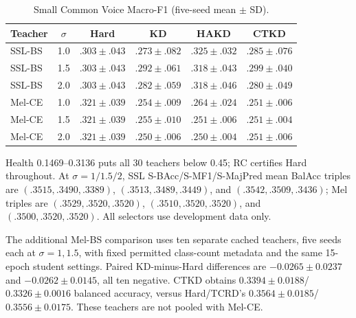 \documentclass[journal]{IEEEtran}
\begin{document}
\begin{table}[t]
\centering\caption{Small Common Voice Macro-F1 (five-seed mean $\pm$ SD).}
\label{tab:cv_mf1}
\scriptsize\setlength{\tabcolsep}{2pt}
\begin{tabular}{lccccc}
\toprule
Teacher & $\sigma$ & Hard & KD & HAKD & CTKD\\\midrule
SSL-BS&1.0&$.303\pm.043$&$.273\pm.082$&$.325\pm.032$&$.285\pm.076$\\
SSL-BS&1.5&$.303\pm.043$&$.292\pm.061$&$.318\pm.043$&$.299\pm.040$\\
SSL-BS&2.0&$.303\pm.043$&$.282\pm.059$&$.318\pm.046$&$.280\pm.049$\\
Mel-CE&1.0&$.321\pm.039$&$.254\pm.009$&$.264\pm.024$&$.251\pm.006$\\
Mel-CE&1.5&$.321\pm.039$&$.255\pm.010$&$.251\pm.006$&$.251\pm.004$\\
Mel-CE&2.0&$.321\pm.039$&$.250\pm.006$&$.250\pm.004$&$.251\pm.006$\\\bottomrule
\end{tabular}
\end{table}

Health 0.1469--0.3136 puts all 30 teachers below 0.45; RC certifies Hard throughout. At $\sigma=1/1.5/2$, SSL S-BAcc/S-MF1/S-MajPred mean BalAcc triples are $(.3515,.3490,.3389)$, $(.3513,.3489,.3449)$, and $(.3542,.3509,.3436)$; Mel triples are $(.3529,.3520,.3520)$, $(.3510,.3520,.3520)$, and $(.3500,.3520,.3520)$. All selectors use development data only.

The additional Mel-BS comparison uses ten separate cached teachers, five seeds each at $\sigma=1,1.5$, with fixed permitted class-count metadata and the same 15-epoch student settings. Paired KD-minus-Hard differences are $-0.0265\pm0.0237$ and $-0.0262\pm0.0145$, all ten negative. CTKD obtains $0.3394\pm0.0188$/$0.3326\pm0.0016$ balanced accuracy, versus Hard/TCRD's $0.3564\pm0.0185$/$0.3556\pm0.0175$. These teachers are not pooled with Mel-CE.



\end{document}
